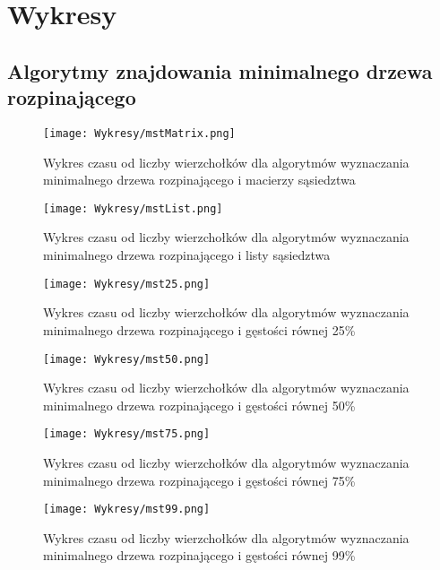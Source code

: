 \documentclass{article}
\begin{document}
\section{Wykresy}

        \subsection{Algorytmy znajdowania minimalnego drzewa rozpinającego}
        
            \begin{figure}[H]
                \centering
                \texttt{[image: Wykresy/mstMatrix.png]}
                \caption{Wykres czasu od liczby wierzchołków dla algorytmów wyznaczania minimalnego drzewa rozpinającego i macierzy sąsiedztwa}
            \end{figure}

            \begin{figure}[H]
                \centering
                \texttt{[image: Wykresy/mstList.png]}
                \caption{Wykres czasu od liczby wierzchołków dla algorytmów wyznaczania minimalnego drzewa rozpinającego i listy sąsiedztwa}
            \end{figure}

            \begin{figure}[H]
                \centering
                \texttt{[image: Wykresy/mst25.png]}
                \caption{Wykres czasu od liczby wierzchołków dla algorytmów wyznaczania minimalnego drzewa rozpinającego i gęstości równej 25\%}
            \end{figure}

            \begin{figure}[H]
                \centering
                \texttt{[image: Wykresy/mst50.png]}
                \caption{Wykres czasu od liczby wierzchołków dla algorytmów wyznaczania minimalnego drzewa rozpinającego i gęstości równej 50\%}
            \end{figure}

            \begin{figure}[H]
                \centering
                \texttt{[image: Wykresy/mst75.png]}
                \caption{Wykres czasu od liczby wierzchołków dla algorytmów wyznaczania minimalnego drzewa rozpinającego i gęstości równej 75\%}
            \end{figure}

            \begin{figure}[H]
                \centering
                \texttt{[image: Wykresy/mst99.png]}
                \caption{Wykres czasu od liczby wierzchołków dla algorytmów wyznaczania minimalnego drzewa rozpinającego i gęstości równej 99\%}
            \end{figure}
\end{document}
